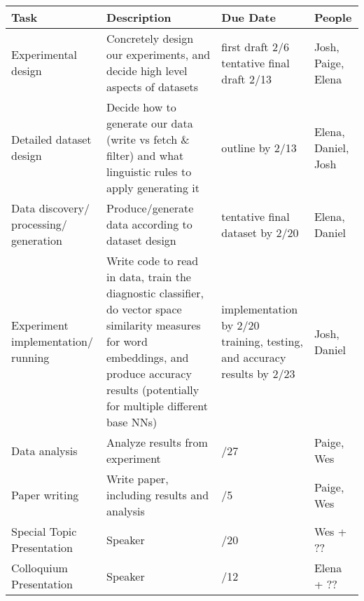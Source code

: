 \documentclass[11pt,a4paper]{article}
\begin{document}
\begin{tabularx}{1.01\textwidth} { 
  | >{\raggedright\arraybackslash}X 
  | >{\centering\arraybackslash}X 
  | >{\centering\arraybackslash}X 
  | >{\raggedleft\arraybackslash}X | }
 \hline
 \textbf{Task} & \textbf{Description} & \textbf{Due Date}  & \textbf{People} \\
 \hline
 Experimental design  &  Concretely design our experiments, and decide high level aspects of datasets
 & {first draft 2/6 \newline
 tentative final draft 2/13} & Josh, Paige, Elena \\
  \hline
 Detailed dataset design  & Decide how to generate our data (write vs fetch \newline \& filter) and what linguistic rules to apply generating 
 it
  & outline by 2/13 & Elena, Daniel, Josh \\
      \hline
 Data discovery\// processing\// generation  & Produce\//generate data according to dataset design
  & tentative final dataset by 2/20 & Elena, Daniel \\
  
      \hline
Experiment implementation\// running & Write code to read in data, train the diagnostic classifier, do vector space similarity measures for word embeddings, and produce accuracy results (potentially for multiple different base NNs)

  &  implementation by 2/20 \newline \newline
  training, testing, and accuracy results by 2/23 & Josh, Daniel \\
  
   \hline
 Data analysis & Analyze results from experiment
  &  2/27 & Paige, Wes \\
    
   \hline
 Paper writing & Write paper, including results and analysis
  &  3/5 & Paige, Wes \\
   \hline
Special Topic Presentation & Speaker
  &  2/20 & Wes + ?? \\
     \hline
Colloquium Presentation
 & Speaker
  &  3/12 & Elena + ?? \\
  
  

\hline
\end{tabularx}

\clearpage



\end{document}
